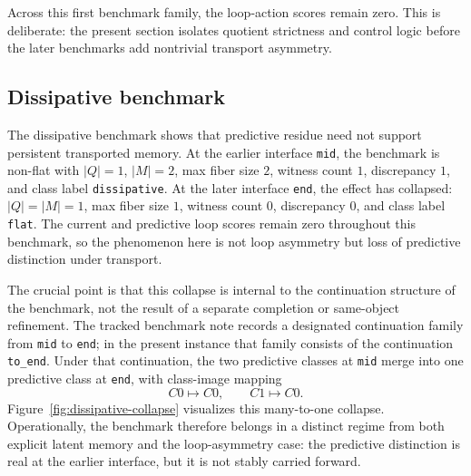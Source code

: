 \documentclass[11pt]{article}
\newcommand{\CurrentQ}{Q}
\newcommand{\PredictiveQ}{M}
\theoremstyle{definition}
\begin{document}
\begin{table}[H]
\centering
\caption{Paired-control readings for the first benchmark family.}
\label{tab:bench-control-pairs}
\footnotesize
\setlength{\tabcolsep}{4pt}
\end{table}

Across this first benchmark family, the loop-action scores remain zero. This is deliberate: the present section isolates quotient strictness and control logic before the later benchmarks add nontrivial transport asymmetry.

\subsection{Dissipative benchmark}\label{subsec:bench-dissipative}
The dissipative benchmark shows that predictive residue need not support persistent transported memory. At the earlier interface \texttt{mid}, the benchmark is non-flat with $|\CurrentQ|=1$, $|\PredictiveQ|=2$, max fiber size $2$, witness count $1$, discrepancy $1$, and class label \texttt{dissipative}. At the later interface \texttt{end}, the effect has collapsed: $|\CurrentQ|=|\PredictiveQ|=1$, max fiber size $1$, witness count $0$, discrepancy $0$, and class label \texttt{flat}. The current and predictive loop scores remain zero throughout this benchmark, so the phenomenon here is not loop asymmetry but loss of predictive distinction under transport.

The crucial point is that this collapse is internal to the continuation structure of the benchmark, not the result of a separate completion or same-object refinement. The tracked benchmark note records a designated continuation family from \texttt{mid} to \texttt{end}; in the present instance that family consists of the continuation \texttt{to\_end}. Under that continuation, the two predictive classes at \texttt{mid} merge into one predictive class at \texttt{end}, with class-image mapping
\[
C0 \mapsto C0,
\qquad
C1 \mapsto C0.
\]
Figure~\ref{fig:dissipative-collapse} visualizes this many-to-one collapse. Operationally, the benchmark therefore belongs in a distinct regime from both explicit latent memory and the loop-asymmetry case: the predictive distinction is real at the earlier interface, but it is not stably carried forward.
\end{document}
